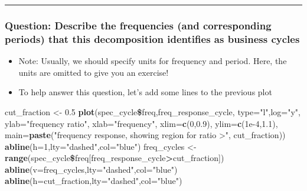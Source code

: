 \documentclass[]{article}
\newenvironment{Shaded}{\begin{snugshade}}{\end{snugshade}}
\newcommand{\KeywordTok}[1]{\textcolor[rgb]{0.13,0.29,0.53}{\textbf{#1}}}
\newcommand{\DataTypeTok}[1]{\textcolor[rgb]{0.13,0.29,0.53}{#1}}
\newcommand{\DecValTok}[1]{\textcolor[rgb]{0.00,0.00,0.81}{#1}}
\newcommand{\FloatTok}[1]{\textcolor[rgb]{0.00,0.00,0.81}{#1}}
\newcommand{\StringTok}[1]{\textcolor[rgb]{0.31,0.60,0.02}{#1}}
\newcommand{\OperatorTok}[1]{\textcolor[rgb]{0.81,0.36,0.00}{\textbf{#1}}}
\newcommand{\NormalTok}[1]{#1}
\begin{document}
\begin{center}\rule{0.5\linewidth}{\linethickness}\end{center}

\subsubsection{Question: Describe the frequencies (and corresponding
periods) that this decomposition identifies as business
cycles}\label{question-describe-the-frequencies-and-corresponding-periods-that-this-decomposition-identifies-as-business-cycles}

\begin{itemize}
\item
  Note: Usually, we should specify units for frequency and period. Here,
  the units are omitted to give you an exercise!
\item
  To help answer this question, let's add some lines to the previous
  plot
\end{itemize}

\begin{Shaded}
\begin{Highlighting}[]
\NormalTok{cut_fraction <-}\StringTok{ }\FloatTok{0.5}
\KeywordTok{plot}\NormalTok{(spec_cycle}\OperatorTok{\$}\NormalTok{freq,freq_response_cycle,}
  \DataTypeTok{type=}\StringTok{"l"}\NormalTok{,}\DataTypeTok{log=}\StringTok{"y"}\NormalTok{,}
  \DataTypeTok{ylab=}\StringTok{"frequency ratio"}\NormalTok{, }\DataTypeTok{xlab=}\StringTok{"frequency"}\NormalTok{, }\DataTypeTok{xlim=}\KeywordTok{c}\NormalTok{(}\DecValTok{0}\NormalTok{,}\FloatTok{0.9}\NormalTok{), }\DataTypeTok{ylim=}\KeywordTok{c}\NormalTok{(}\FloatTok{1e-4}\NormalTok{,}\FloatTok{1.1}\NormalTok{),}
  \DataTypeTok{main=}\KeywordTok{paste}\NormalTok{(}\StringTok{"frequency response, showing region for ratio >"}\NormalTok{, cut_fraction))}
\KeywordTok{abline}\NormalTok{(}\DataTypeTok{h=}\DecValTok{1}\NormalTok{,}\DataTypeTok{lty=}\StringTok{"dashed"}\NormalTok{,}\DataTypeTok{col=}\StringTok{"blue"}\NormalTok{)  }
\NormalTok{freq_cycles <-}\StringTok{ }\KeywordTok{range}\NormalTok{(spec_cycle}\OperatorTok{\$}\NormalTok{freq[freq_response_cycle}\OperatorTok{>}\NormalTok{cut_fraction]) }
\KeywordTok{abline}\NormalTok{(}\DataTypeTok{v=}\NormalTok{freq_cycles,}\DataTypeTok{lty=}\StringTok{"dashed"}\NormalTok{,}\DataTypeTok{col=}\StringTok{"blue"}\NormalTok{) }
\KeywordTok{abline}\NormalTok{(}\DataTypeTok{h=}\NormalTok{cut_fraction,}\DataTypeTok{lty=}\StringTok{"dashed"}\NormalTok{,}\DataTypeTok{col=}\StringTok{"blue"}\NormalTok{)}
\end{Highlighting}
\end{Shaded}
\end{document}
